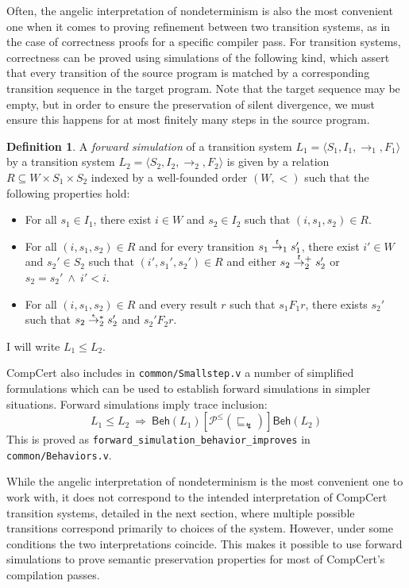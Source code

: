\documentclass[11pt,oneside]{book}
\theoremstyle{definition}
\newtheorem{definition}[theorem]{Definition}
\newcommand{\kw}[1]{\ensuremath{ \mathsf{#1} }}
\newcommand{\ifr}[1]{\mathrel{[{#1}]}}
\newcommand{\refby}{\sqsubseteq} %
\begin{document}
Often,
the angelic interpretation of nondeterminism
is also the most convenient one
when it comes to proving refinement between
two transition systems,
as in the case of correctness proofs for
a specific compiler pass.
For transition systems,
correctness can be proved using simulations of the following kind,
which assert that every transition of the source program
is matched by a corresponding transition sequence in the target program.
Note that the target sequence may be empty,
but in order to ensure the preservation of silent divergence,
we must ensure this happens for at most
finitely many steps in the source program.

\begin{definition}
A \emph{forward simulation}
of a transition system
$L_1 = \langle S_1, I_1, {\rightarrow}_1, F_1 \rangle$
by a transition system
$L_2 = \langle S_2, I_2, {\rightarrow}_2, F_2 \rangle$
is given by a relation $R \subseteq W \times S_1 \times S_2$
indexed by a well-founded order $(W, {<})$
such that the following properties hold:
\begin{itemize}
  \item For all $s_1 \in I_1$,
    there exist $i \in W$ and $s_2 \in I_2$
    such that $(i, s_1, s_2) \in R$.
  \item For all $(i, s_1, s_2) \in R$
    and for every transition
    $s_1 \mathrel{\smash{\stackrel{t}{\rightarrow}}_1} s_1'$,
    there exist $i' \in W$ and $s_2' \in S_2$
    such that $(i', s_1', s_2') \in R$ and either
    $s_2 \mathrel{\smash{\stackrel{t}{\rightarrow}}_2^+} s_2'$ or
    $s_2 = s_2' \:\wedge\: i' < i$.
  \item For all $(i, s_1, s_2) \in R$
    and every result $r$ such that $s_1 \mathrel{F_1} r$,
    there exists $s_2'$ such that
    $s_2 \mathrel{\smash{\stackrel{\epsilon}{\rightarrow}}_2^*} s_2'$ and
    $s_2' \mathrel{F_2} r$.
\end{itemize}
I will write $L_1 \le L_2$.
\end{definition}

CompCert also includes in \texttt{common/Smallstep.v}
a number of simplified formulations
which can be used to establish forward simulations
in simpler situations.
Forward simulations imply trace inclusion:
\[
  L_1 \le L_2
  \: \Rightarrow \:
  \kw{Beh}(L_1) \ifr{\mathcal{P}^\le(\refby_\lightning)} \kw{Beh}(L_2)
\]
This is proved as \texttt{forward\_simulation\_behavior\_improves}
in \texttt{common/Behaviors.v}.

While the angelic interpretation
of nondeterminism is the most convenient one to work with,
it does not correspond to the intended interpretation
of CompCert transition systems,
detailed in the next section,
where multiple possible transitions correspond
primarily to choices of the system.
However,
under some conditions
the two interpretations coincide.
This makes it possible to use forward simulations
to prove semantic preservation properties
for most of CompCert's compilation passes.
\end{document}
